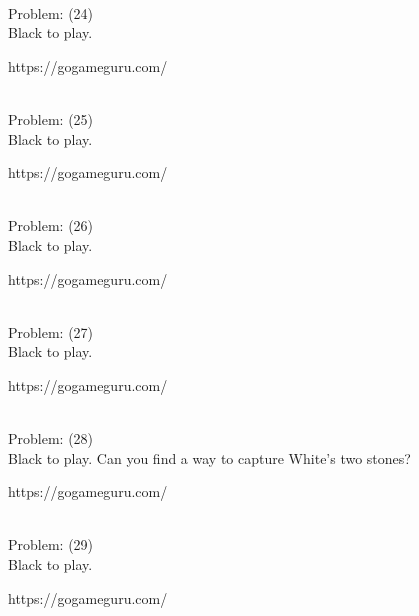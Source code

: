 \documentclass[11pt]{article}
\begin{document}
\begin{minipage}[t]{0.5\textwidth}
  {\centering
  
\\
Problem: (24)\\
Black to play.

https://gogameguru.com/\\
  }
\end{minipage}
\begin{minipage}[t]{0.5\textwidth}
  {\centering
  
\\
Problem: (25)\\
Black to play.

https://gogameguru.com/\\
  }
\end{minipage}
\begin{minipage}[t]{0.5\textwidth}
  {\centering
  
\\
Problem: (26)\\
Black to play.

https://gogameguru.com/\\
  }
\end{minipage}
\begin{minipage}[t]{0.5\textwidth}
  {\centering
  
\\
Problem: (27)\\
Black to play.

https://gogameguru.com/\\
  }
\end{minipage}
\begin{minipage}[t]{0.5\textwidth}
  {\centering
  
\\
Problem: (28)\\
Black to play. Can you find a way to capture White's two stones?

https://gogameguru.com/\\
  }
\end{minipage}
\begin{minipage}[t]{0.5\textwidth}
  {\centering
  
\\
Problem: (29)\\
Black to play.

https://gogameguru.com/\\
  }
\end{minipage}
\end{document}

